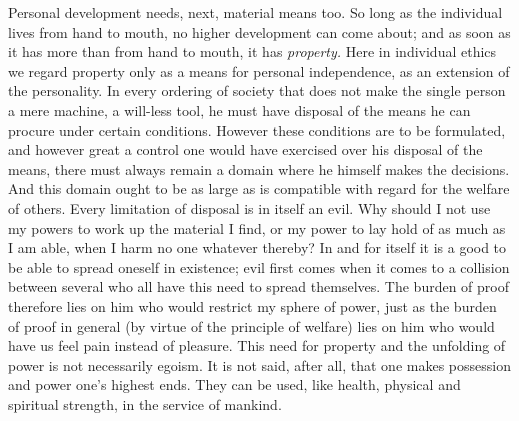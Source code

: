 \documentclass[12pt,a4paper,openany]{book}
\newcommand{\opage}[1]{\marginnote{\footnotesize\textit{[#1]}}}
\begin{document}
Personal development needs, next, material means too. So long as the individual lives from hand to mouth, no higher
development can come about; and as soon as it has more than from hand to mouth, it has \textit{property.} Here in
individual ethics we regard property only as a means for personal independence, as an extension of the personality.
In every ordering of society that does not make the single person a mere machine, a will-less tool, he must have
disposal of the means he can procure under certain conditions. However these conditions are to be formulated, and
however great a control one would have exercised over his disposal of the means, there must always remain a domain
where he himself makes the decisions. And this domain ought to be as large as is compatible with regard for the
welfare of others. Every limitation of disposal is in itself an evil. Why should I not use my powers to work up the
material I find, or my power to lay hold of as much as I am able, when I harm no one whatever thereby? In and for
itself it is a good to be able to spread
\opage{235}oneself in existence; evil first comes when it comes to a collision between several who all have this need
to spread themselves. The burden of proof therefore lies on him who would restrict my sphere of power, just as the
burden of proof in general (by virtue of the principle of welfare) lies on him who would have us feel pain instead of
pleasure. This need for property and the unfolding of power is not necessarily egoism. It is not said, after all,
that one makes possession and power one's highest ends. They can be used, like health, physical and spiritual
strength, in the service of mankind.
\end{document}
